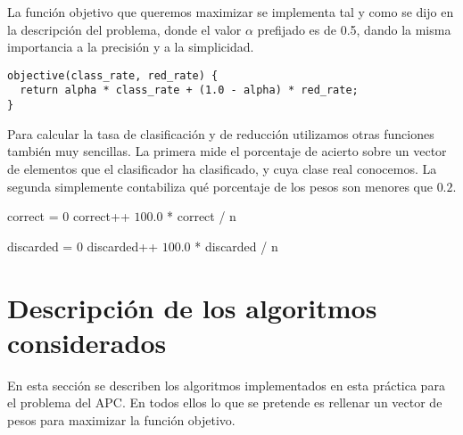 \documentclass[12pt]{article}
\begin{document}
La función objetivo que queremos maximizar se implementa tal y como se dijo en la descripción del problema, donde el valor $\alpha$ prefijado es de 0.5, dando la misma importancia a la precisión y a la simplicidad.

\begin{verbatim}
objective(class_rate, red_rate) {
  return alpha * class_rate + (1.0 - alpha) * red_rate;
}
\end{verbatim}

Para calcular la tasa de clasificación y de reducción utilizamos otras funciones también muy sencillas. La primera mide el porcentaje de acierto sobre un vector de elementos que el clasificador ha clasificado, y cuya clase real conocemos. La segunda simplemente contabiliza qué porcentaje de los pesos son menores que $0.2$.

\begin{algorithm}[h!]
\begin{algorithmic}

    \State correct = $0$
      
            \State correct++
        \EndIf
    \EndFor
    \State \Return $100.0$ * correct / n
\EndFunction

\end{algorithmic}
\end{algorithm}

\vspace{-1em}

\begin{algorithm}[h!]
\begin{algorithmic}

    \State discarded = $0$
      
            \State discarded++
        \EndIf
    \EndFor
    \State \Return $100.0$ * discarded / n
\EndFunction

\end{algorithmic}
\end{algorithm}


\newpage
\section{Descripción de los algoritmos considerados}
En esta sección se describen los algoritmos implementados en esta práctica para el problema del APC. En todos ellos lo que se pretende es rellenar un vector de pesos para maximizar la función objetivo.
\end{document}

